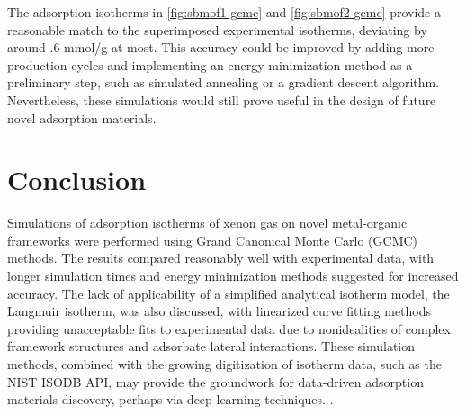 \documentclass{article}
\begin{document}
The adsorption isotherms in \autoref{fig:sbmof1-gcmc} and \autoref{fig:sbmof2-gcmc} provide a reasonable match to the superimposed experimental isotherms, deviating by around .6 mmol/g at most.
This accuracy could be improved by adding more production cycles and implementing an energy minimization method as a preliminary step, such as simulated annealing or a gradient descent algorithm.
Nevertheless, these simulations would still prove useful in the design of future novel adsorption materials.

\section{Conclusion}
Simulations of adsorption isotherms of xenon gas on novel metal-organic frameworks were performed using Grand Canonical Monte Carlo (GCMC) methods.
The results compared reasonably well with experimental data, with longer simulation times and energy minimization methods suggested for increased accuracy.
The lack of applicability of a simplified analytical isotherm model, the Langmuir isotherm, was also discussed, with linearized curve fitting methods providing unacceptable fits to experimental data due to nonidealities of complex framework structures and adsorbate lateral interactions.
These simulation methods, combined with the growing digitization of isotherm data, such as the NIST ISODB API, may provide the groundwork for data-driven adsorption materials discovery, perhaps via deep learning techniques. \cite{mining, materials-ml}.

\printbibliography
\end{document}
